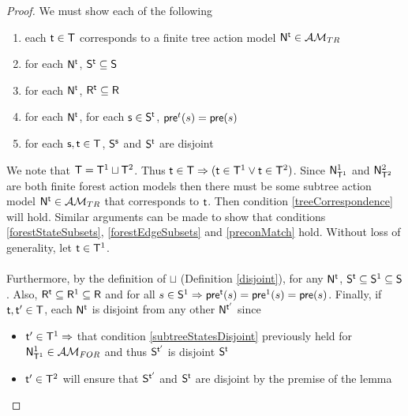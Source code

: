 \begin{proof}
We must show each of the following
\begin{enumerate}
	\item each $\evt \in \evT$ corresponds to a finite tree action model $\evM^\evt \in \treeClass$ \label{treeCorrespondence}
	\item for each $\evM^\evt$, $\evS^\evt \subseteq \evS$ \label{forestStateSubsets}
	\item for each $\evM^\evt$, $\evR^\evt \subseteq \evR$ \label{forestEdgeSubsets}
	\item for each $\evM^\evt$, for each $\evs \in \evS^\evt$, $\evpr^t(s) = \evpr(s)$ \label{preconMatch}
	\item for each $\evs, \evt \in \evT$, $\evS^\evs$ and $\evS^\evt$ are disjoint \label{subtreeStatesDisjoint}
\end{enumerate}

We note that $\evT = \evT^1 \sqcup \evT^2$.
Thus $\evt \in \evT \Rightarrow (\evt \in \evT^1 \lor \evt \in \evT^2)$.
Since $\evM^1_{\evT^1}$ and $\evM^2_{\evT^2}$ are both finite forest action models then there must be some
subtree action model $\evM^\evt \in \treeClass$ that corresponds to $\evt$.
Then condition \ref{treeCorrespondence} will hold.
Similar arguments can be made to show that conditions \ref{forestStateSubsets}, \ref{forestEdgeSubsets}
and \ref{preconMatch} hold.
Without loss of generality, let $\evt \in \evT^1$.\\
\\
Furthermore, by the definition of $\sqcup$ (Definition \ref{disjoint}), for any $\evM^\evt$, $\evS^\evt \subseteq \evS^1 \subseteq \evS$.
Also, $\evR^\evt \subseteq \evR^1 \subseteq \evR$ and for all $s \in \evS^1 \Rightarrow \evpr^\evt(s) = \evpr^1(s) =
\evpr(s)$.
Finally, if $\evt, \evt' \in \evT$, each $\evM^\evt$ is disjoint from any other $\evM^{\evt'}$ since
\begin{itemize}
	\item $\evt' \in \evT^1 \Rightarrow$ that condition \ref{subtreeStatesDisjoint} previously held for
	$\evM^1_{\evT^1} \in \forestClass$ and thus $\evS^{\evt'}$ is disjoint $\evS^\evt$
	\item $\evt' \in \evT^2$ will ensure that $\evS^{\evt'}$ and $\evS^\evt$ are disjoint by the premise of
	the lemma
\end{itemize}
\end{proof}

